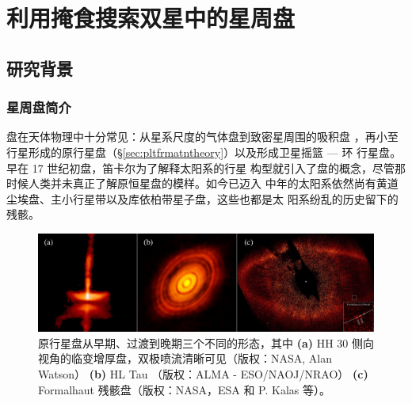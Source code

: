\chapter{利用掩食搜索双星中的星周盘} \label{chapter:form_evo}

\section{研究背景} \label{sec:diskbackground}

\subsection{星周盘简介} \label{sec:diskintro}

盘在天体物理中十分常见：从星系尺度的气体盘\cite{Binney1987,Gilmore1989}到致密星周围的吸积盘
\cite{Pringle1981}，再小至行星形成的原行星盘（\S \ref{sec:pltfrmatntheory}）以及形成卫星摇篮 --- 环
行星盘\cite{Smith1981,Latter2017,Mosqueira2003}。早在 17 世纪初盘，笛卡尔为了解释太阳系的行星
构型就引入了盘的概念，尽管那时候人类并未真正了解原恒星盘的模样\cite{Kawabe1993}。如今已迈入
中年的太阳系依然尚有黄道尘埃盘\cite{Dermott1994}、主小行星带以及库依柏带星子盘，这些也都是太
阳系纷乱的历史留下的残骸\cite{Dohnanyi1969}。


\begin{figure}[b]
\centering
\includegraphics[width=1.0\textwidth]{figures/chapter3/f2_obsdisc.jpg}
\caption{原行星盘从早期、过渡到晚期三个不同的形态，其中 \textbf{(a)} HH 30 侧向视角的临变增厚盘，双极喷流清晰可见（版权：NASA, Alan Watson） \textbf{(b)} HL Tau （版权：ALMA - ESO/NAOJ/NRAO） \textbf{(c)} Formalhaut 残骸盘（版权：NASA，ESA 和 P. Kalas 等）。}
\label{fig:obsdisc}
\end{figure}

